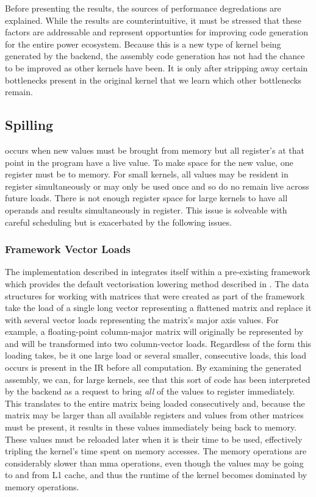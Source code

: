 \documentclass[\main/thesis.tex]{subfiles}
\begin{document}
Before presenting the results, the sources of performance degredations are explained.
While the results are counterintuitive, it must be stressed that these factors are addressable and represent opportunties for improving code generation for the entire \gls{power} ecosystem.
Because this is a new type of kernel being generated by the backend, the assembly code generation has not had the chance to be improved as other kernels have been.
It is only after stripping away certain bottlenecks present in the original kernel that we learn which other bottlenecks remain.

\subsection{Spilling}
 occurs when new values must be brought from memory but all register's at that \gls{point} in the program have a \gls{live} value.
To make space for the new value, one register must be  to memory.
For small kernels, all values may be resident in register simultaneously or may only be used once and so do no remain live across future loads.
There is not enough register space for large kernels to have all operands and results simultaneously in register.
This issue is solveable with careful scheduling but is exacerbated by the following issues.

\subsubsection{Framework Vector Loads}
\label{sec:test}
The implementation described in  integrates itself within a pre-existing framework which provides the default vectorisation lowering method described in .
The data structures for working with matrices that were created as part of the framework take the load of a single long vector representing a flattened matrix and replace it with several vector loads representing the matrix's major axis values.
For example, a floating-point column-major matrix  will originally be represented by  and will be transformed into two  column-vector loads.
Regardless of the form this loading takes, be it one large load or several smaller, consecutive loads, this load occurs is present in the IR before all computation.
By examining the generated assembly,  we can, for large kernels, see that this sort of code has been interpreted by the backend as a request to bring \emph{all} of the values to register immediately.
This translates to the entire matrix being loaded consecutively and, because the matrix may be larger than all available registers and values from other matrices must be present, it results in these values immediately being  back to memory.
These values must be reloaded later when it is their time to be used, effectively tripling the kernel's time spent on memory accesses.
The memory operations are considerably slower than \gls{mma} operations, even though the values may be going to and from L1 cache, and thus the runtime of the kernel becomes dominated by memory operations.
\end{document}
